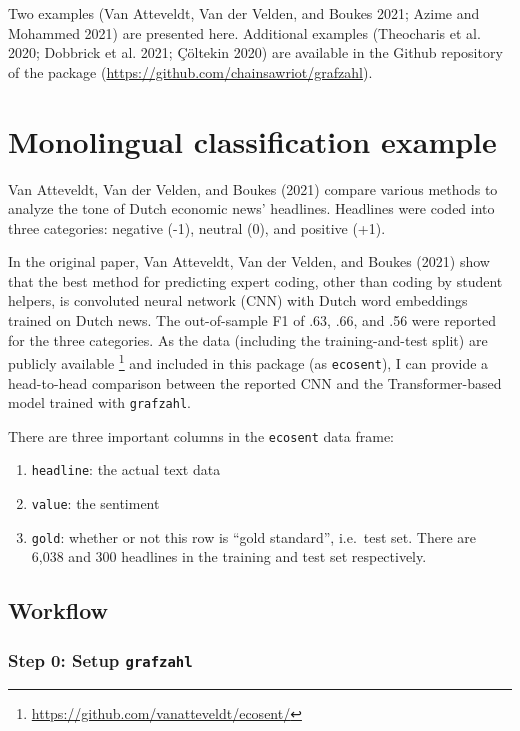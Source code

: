 \documentclass[
]{ccr}
\providecommand{\tightlist}{%
  \setlength{\itemsep}{0pt}\setlength{\parskip}{0pt}}\usepackage{longtable,booktabs,array}
\begin{document}
Two examples (Van Atteveldt, Van der Velden, and Boukes 2021; Azime and
Mohammed 2021) are presented here. Additional examples (Theocharis et
al. 2020; Dobbrick et al. 2021; Çöltekin 2020) are available in the
Github repository of the package
(\url{https://github.com/chainsawriot/grafzahl}).

\hypertarget{monolingual-classification-example}{%
\section{Monolingual classification
example}\label{monolingual-classification-example}}

Van Atteveldt, Van der Velden, and Boukes (2021) compare various methods
to analyze the tone of Dutch economic news' headlines. Headlines were
coded into three categories: negative (-1), neutral (0), and positive
(+1).

In the original paper, Van Atteveldt, Van der Velden, and Boukes (2021)
show that the best method for predicting expert coding, other than
coding by student helpers, is convoluted neural network (CNN) with Dutch
word embeddings trained on Dutch news. The out-of-sample F1 of .63, .66,
and .56 were reported for the three categories. As the data (including
the training-and-test split) are publicly available \footnote{\url{https://github.com/vanatteveldt/ecosent/}}
and included in this package (as \texttt{ecosent}), I can provide a
head-to-head comparison between the reported CNN and the
Transformer-based model trained with \texttt{grafzahl}.

There are three important columns in the \texttt{ecosent} data frame:

\begin{enumerate}
\def\labelenumi{\arabic{enumi}.}
\tightlist
\item
  \texttt{headline}: the actual text data
\item
  \texttt{value}: the sentiment
\item
  \texttt{gold}: whether or not this row is ``gold standard'', i.e.~test
  set. There are 6,038 and 300 headlines in the training and test set
  respectively.
\end{enumerate}

\hypertarget{workflow}{%
\subsection{Workflow}\label{workflow}}

\hypertarget{step-0-setup-grafzahl}{%
\subsubsection{\texorpdfstring{Step 0: Setup
\texttt{grafzahl}}{Step 0: Setup grafzahl}}\label{step-0-setup-grafzahl}}
\end{document}
